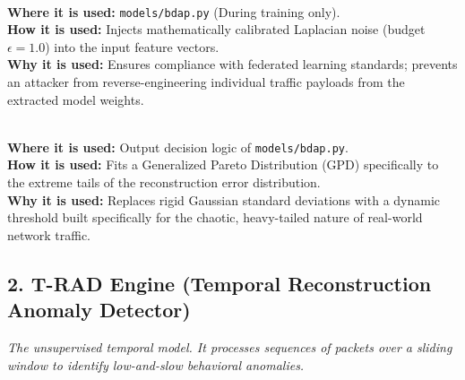 \documentclass[11pt,a4paper]{article}
\begin{document}
\begin{description}[style=unboxed, leftmargin=0cm]
    \item[\textcolor{primary}{5. Differential Privacy (DP) Noise (v3/v4)}] \hfill \\
    \textbf{Where it is used:} \texttt{models/bdap.py} (During training only). \\
    \textbf{How it is used:} Injects mathematically calibrated Laplacian noise (budget $\epsilon = 1.0$) into the input feature vectors. \\
    \textbf{Why it is used:} Ensures compliance with federated learning standards; prevents an attacker from reverse-engineering individual traffic payloads from the extracted model weights.

    \item[\textcolor{primary}{6. Extreme Value Theory (EVT) Thresholding (v3)}] \hfill \\
    \textbf{Where it is used:} Output decision logic of \texttt{models/bdap.py}. \\
    \textbf{How it is used:} Fits a Generalized Pareto Distribution (GPD) specifically to the extreme tails of the reconstruction error distribution. \\
    \textbf{Why it is used:} Replaces rigid Gaussian standard deviations with a dynamic threshold built specifically for the chaotic, heavy-tailed nature of real-world network traffic.
\end{description}

\subsection{2. T-RAD Engine (Temporal Reconstruction Anomaly Detector)}
\textit{The unsupervised temporal model. It processes sequences of packets over a sliding window to identify low-and-slow behavioral anomalies.}
\end{document}
